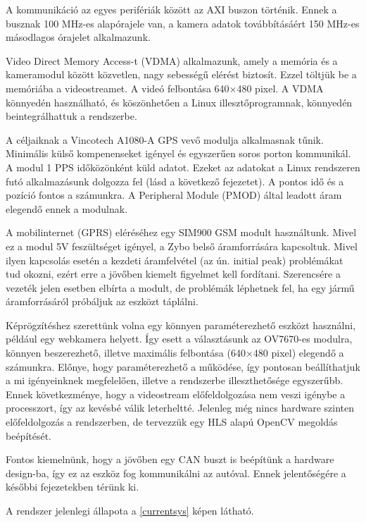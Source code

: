 \documentclass[a4paper,12pt]{report}
\begin{document}
A kommunikáció az egyes perifériák között az AXI buszon történik. Ennek a busznak 100 MHz-es alapórajele van, a kamera adatok továbbításáért 150 MHz-es másodlagos órajelet alkalmazunk.

Video Direct Memory Access-t (VDMA) alkalmazunk, amely a memória és a kameramodul között közvetlen, nagy sebességű elérést biztosít. Ezzel töltjük be a memóriába a videostreamet. A videó felbontása 640$\times$480 pixel. A VDMA könnyedén használható, és köszönhetően a Linux illesztőprogramnak, könnyedén beintegrálhattuk a rendszerbe.

A céljaiknak a Vincotech A1080-A GPS vevő modulja alkalmasnak tűnik. Minimális külső kompenenseket igényel és egyszerűen soros porton kommunikál. A modul 1 PPS időközönként küld adatot. Ezeket az adatokat a Linux rendszeren futó alkalmazásunk dolgozza fel (lásd a következő fejezetet). A pontos idő és a pozíció fontos a számunkra. A Peripheral Module (PMOD) által leadott áram elegendő ennek a modulnak.

A mobilinternet (GPRS) eléréséhez egy SIM900 GSM modult használtunk. Mivel ez a modul 5V feszültséget igényel, a Zybo belső áramforrására kapcsoltuk. Mivel ilyen kapcsolás esetén a kezdeti áramfelvétel (az ún. initial peak) problémákat tud okozni, ezért erre a jövőben kiemelt figyelmet kell fordítani. Szerencsére a vezeték jelen esetben elbírta a modult, de problémák léphetnek fel, ha egy jármű áramforrásáról próbáljuk az eszközt táplálni.

Képrögzítéshez szerettünk volna egy könnyen paraméterezhető eszközt használni, például egy webkamera helyett. Így esett a választásunk az OV7670-es modulra, könnyen beszerezhető, illetve maximális felbontása (640$\times$480 pixel) elegendő a számunkra. Előnye, hogy paraméterezhető a működése, így pontosan beállíthatjuk a mi igényeinknek megfelelően, illetve a rendszerbe illeszthetősége egyszerűbb. Ennek következménye, hogy a videostream előfeldolgozása nem veszi igénybe a processzort, így az kevésbé válik leterheltté. Jelenleg még nincs hardware szinten előfeldolgozás a rendszerben, de tervezzük egy HLS alapú OpenCV megoldás beépítését.

Fontos kiemelnünk, hogy a jövőben egy CAN buszt is beépítünk a hardware design-ba, így ez az eszköz fog kommunikálni az autóval. Ennek jelentőségére a későbbi fejezetekben térünk ki.

A rendszer jelenlegi állapota a \ref{currentsys} képen látható.
\end{document}
